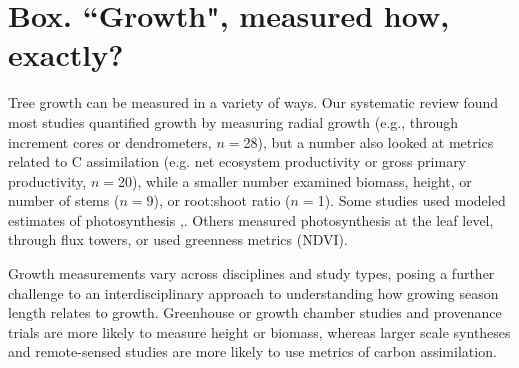 \documentclass[11pt]{article}
\begin{document}

\newpage
\section{Box. ``Growth", measured how, exactly?}
Tree growth can be measured in a variety of ways. Our systematic review found most studies quantified growth by measuring radial growth (e.g., through increment cores or dendrometers, $n=$28), but a number also looked at metrics related to C assimilation (e.g. net ecosystem productivity or gross primary productivity, $n=$20), while a smaller number examined biomass, height, or number of stems ($n=$9), or root:shoot ratio ($n=$1). Some studies used modeled estimates of photosynthesis 
\citep[e.g.,][relies on daily photosynthesis estimates derived from the LPJ-GUESS photosynthesis model,]{smith2014implications,},\citep[][estimates photosynthese using the Integrated Terrestrial Ecosystem C-budget model(InTEC), Chen et al 2000]{chen2000approaches}. Others measured photosynthesis at the leaf level, through flux towers, or used greenness metrics (NDVI). 

Growth measurements vary across disciplines and study types, posing a further challenge to an interdisciplinary approach to understanding how growing season length relates to growth. Greenhouse or growth chamber studies and provenance trials are more likely to measure height or biomass, whereas larger scale syntheses and remote-sensed studies are more likely to use metrics of carbon assimilation. 
\end{document}
